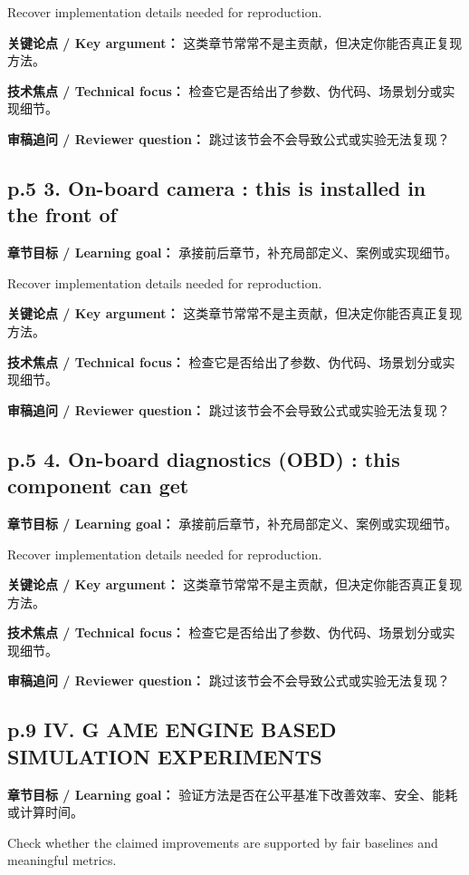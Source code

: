 \documentclass[UTF8,a4paper,11pt,fontset=fandol]{ctexart}
\begin{document}
Recover implementation details needed for reproduction.

\textbf{关键论点 / Key argument：} 这类章节常常不是主贡献，但决定你能否真正复现方法。

\textbf{技术焦点 / Technical focus：} 检查它是否给出了参数、伪代码、场景划分或实现细节。

\textbf{审稿追问 / Reviewer question：} 跳过该节会不会导致公式或实验无法复现？

\subsection*{p.5 3. On-board camera : this is installed in the front of}
\textbf{章节目标 / Learning goal：} 承接前后章节，补充局部定义、案例或实现细节。

Recover implementation details needed for reproduction.

\textbf{关键论点 / Key argument：} 这类章节常常不是主贡献，但决定你能否真正复现方法。

\textbf{技术焦点 / Technical focus：} 检查它是否给出了参数、伪代码、场景划分或实现细节。

\textbf{审稿追问 / Reviewer question：} 跳过该节会不会导致公式或实验无法复现？

\subsection*{p.5 4. On-board diagnostics (OBD) : this component can get}
\textbf{章节目标 / Learning goal：} 承接前后章节，补充局部定义、案例或实现细节。

Recover implementation details needed for reproduction.

\textbf{关键论点 / Key argument：} 这类章节常常不是主贡献，但决定你能否真正复现方法。

\textbf{技术焦点 / Technical focus：} 检查它是否给出了参数、伪代码、场景划分或实现细节。

\textbf{审稿追问 / Reviewer question：} 跳过该节会不会导致公式或实验无法复现？

\subsection*{p.9 IV. G AME ENGINE BASED SIMULATION EXPERIMENTS}
\textbf{章节目标 / Learning goal：} 验证方法是否在公平基准下改善效率、安全、能耗或计算时间。

Check whether the claimed improvements are supported by fair baselines and meaningful metrics.
\end{document}
